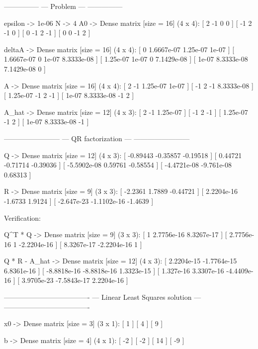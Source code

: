\documentclass[a4paper,14pt]{extarticle}
\newenvironment{tinyverbatim}%
{\footnotesize\verbatim}%
{\endverbatim}
\begin{document}
\begin{tinyverbatim}
---------------
--- Problem ---
---------------

epsilon -> 1e-06
N       -> 4
A0      -> Dense matrix [size = 16] (4 x 4):
  [  2 -1  0  0 ]
  [ -1  2 -1  0 ]
  [  0 -1  2 -1 ]
  [  0  0 -1  2 ]

deltaA  -> Dense matrix [size = 16] (4 x 4):
  [          0 1.6667e-07   1.25e-07      1e-07 ]
  [ 1.6667e-07          0      1e-07 8.3333e-08 ]
  [   1.25e-07      1e-07          0 7.1429e-08 ]
  [      1e-07 8.3333e-08 7.1429e-08          0 ]

A       -> Dense matrix [size = 16] (4 x 4):
  [        2         -1 1.25e-07      1e-07 ]
  [       -1          2       -1 8.3333e-08 ]
  [ 1.25e-07         -1        2         -1 ]
  [    1e-07 8.3333e-08       -1          2 ]

A_hat   -> Dense matrix [size = 12] (4 x 3):
  [        2         -1 1.25e-07 ]
  [       -1          2       -1 ]
  [ 1.25e-07         -1        2 ]
  [    1e-07 8.3333e-08       -1 ]

------------------------
--- QR factorization ---
------------------------

Q             -> Dense matrix [size = 12] (4 x 3):
  [    -0.89443   -0.35857 -0.19518 ]
  [     0.44721   -0.71714 -0.39036 ]
  [ -5.5902e-08    0.59761 -0.58554 ]
  [ -4.4721e-08 -9.761e-08  0.68313 ]

R             -> Dense matrix [size = 9] (3 x 3):
  [    -2.2361      1.7889 -0.44721 ]
  [ 2.2204e-16     -1.6733   1.9124 ]
  [ -2.647e-23 -1.1102e-16  -1.4639 ]

Verification:

Q^T * Q       -> Dense matrix [size = 9] (3 x 3):
  [          1  2.7756e-16  8.3267e-17 ]
  [ 2.7756e-16           1 -2.2204e-16 ]
  [ 8.3267e-17 -2.2204e-16           1 ]

Q * R - A_hat -> Dense matrix [size = 12] (4 x 3):
  [  2.2204e-15 -1.7764e-15  6.8361e-16 ]
  [ -8.8818e-16 -8.8818e-16  1.3323e-15 ]
  [   1.327e-16  3.3307e-16 -4.4409e-16 ]
  [  3.9705e-23 -7.5843e-17  2.2204e-16 ]

-------------------------------------
--- Linear Least Squares solution ---
-------------------------------------

x0                 -> Dense matrix [size = 3] (3 x 1):
  [ 1 ]
  [ 4 ]
  [ 9 ]

b                  -> Dense matrix [size = 4] (4 x 1):
  [ -2 ]
  [ -2 ]
  [ 14 ]
  [ -9 ]


\end{tinyverbatim}
\end{document}
